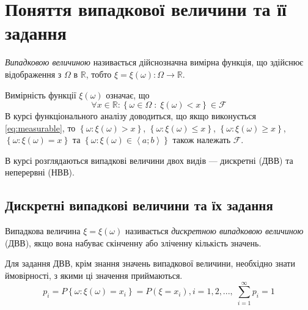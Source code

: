 
\section{Поняття випадкової величини та її задання}
\begin{definition}
    \emph{Випадковою величиною} називається дійснозначна вимірна функція, що здійснює 
    відображення з $\Omega$ в $\mathbb{R}$, тобто $\xi = \xi(\omega): \Omega 
    \rightarrow \mathbb{R}$.
\end{definition}
\begin{remark}
    Вимірність функції $\xi(\omega)$ означає, що 
    \begin{equation}\label{eq:measurable}
        \forall x \in \mathbb{R}: 
        \left\{ \omega \in \Omega\; :\; \xi(\omega) < x\right\} \in \mathcal{F}
    \end{equation} В курсі 
    функціонального аналізу доводиться, що якщо виконується \eqref{eq:measurable}, то
    $\left\{ \omega: \xi(\omega) > x\right\}$, $\left\{ \omega: \xi(\omega) \leq x\right\}$,
    $\left\{ \omega: \xi(\omega) \geq x\right\}$, $\left\{ \omega: \xi(\omega) = x\right\}$ та
    $\left\{ \omega: \xi(\omega) \in \left< a; b\right> \right\}$ також належать $\mathcal{F}$.
\end{remark}

В курсі розглядаються випадкові величини двох видів --- дискретні (ДВВ) та неперервні (НВВ).

\subsection{Дискретні випадкові величини та їх задання}
\begin{definition}
    Випадкова величина $\xi = \xi(\omega)$ називається 
    \emph{дискретною випадковою величиною} (ДВВ), якщо вона набуває скінченну або зліченну 
    кількість значень.
\end{definition}
Для задання ДВВ, крім знання значень випадкової величини, необхідно знати ймовірності, 
з якими ці значення приймаються.
$$p_i = P\left\{\omega: \xi(\omega) = x_i\right\} = P(\xi = x_i), i = 1,2,... , \; \sum_{i=1}^\infty p_i = 1$$

